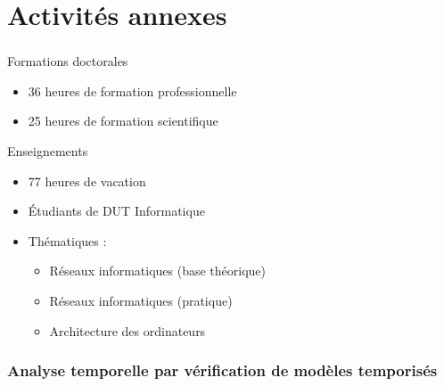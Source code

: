 \documentclass{beamer}
\begin{document}
  \section*{Activités annexes}
  \begin{frame}
    \frametitle{\secname}
    
    \begin{block}{Formations doctorales}
      \begin{itemize}
        \item 36 heures de formation professionnelle\footnotemark[1]
        \item 25 heures de formation scientifique\footnotemark[1]
      \end{itemize}
    \end{block}

    \begin{block}{Enseignements}
      \begin{itemize}
        \item 77 heures de vacation\footnotemark[1]
        \item Étudiants de DUT Informatique
        \item Thématiques :
          \begin{itemize}
            \item Réseaux informatiques (base théorique)
            \item Réseaux informatiques (pratique)
            \item Architecture des ordinateurs
          \end{itemize}
      \end{itemize}
    \end{block}
    
  \end{frame}

  \begin{frame}
    \frametitle{Analyse temporelle par vérification de modèles temporisés}
    \tableofcontents
  \end{frame}

\end{document}
